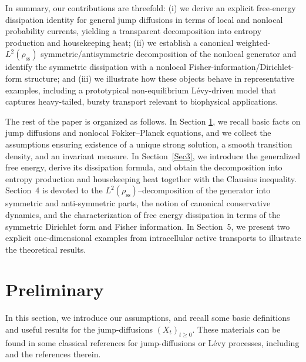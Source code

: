 \documentclass[10pt]{article}
\theoremstyle{definition}
\numberwithin{equation}{section}
\begin{document}
In summary, our contributions are threefold: 
(i) we derive an explicit free-energy dissipation identity for general jump diffusions in terms of local and nonlocal probability currents, yielding a transparent decomposition into entropy production and housekeeping heat; 
(ii) we establish a canonical weighted-$L^2(\rho_{\mathrm{ss}})$ symmetric/antisymmetric decomposition of the nonlocal generator and identify the symmetric dissipation with a nonlocal Fisher-information/Dirichlet-form structure; 
and (iii) we illustrate how these objects behave in representative examples, including a prototypical non-equilibrium L\'evy-driven model that captures heavy-tailed, bursty transport relevant to biophysical applications.


The rest of the paper is organized as follows. 
In Section \ref{Sec2}, we recall basic facts on jump diffusions and nonlocal Fokker–Planck equations, and we collect the assumptions ensuring existence of a unique strong solution, a smooth transition density, and an invariant measure. 
In Section~\ref{Sec3}, we introduce the generalized free energy, derive its dissipation formula, and obtain the decomposition into entropy production and housekeeping heat together with the Clausius inequality. 
Section~4 is devoted to the $L^2(\rho_\mathrm{ss})$–decomposition of the generator into symmetric and anti-symmetric parts, the notion of canonical conservative dynamics, and the characterization of free energy dissipation in terms of the symmetric Dirichlet form and Fisher information. In Section~5, we present two explicit one-dimensional examples  from intracellular active transports to illustrate the theoretical results.



\section{Preliminary}\label{Sec2}

In this section, we introduce our assumptions, and recall some basic definitions and useful results for the jump-diffusions $(X_t)_{t \geq 0}$. 
These materials can be found in some classical references for jump-diffusions or L\'{e}vy processes, including \cite{A2004, S99, K19} and the references therein.
\end{document}
